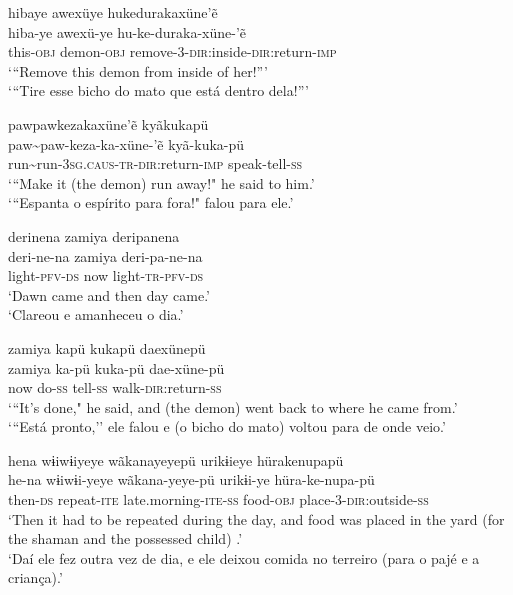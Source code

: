 \documentclass[output=paper,
modfonts,nonflat
]{langsci/langscibook}
\begin{document}
  
\ea     hibaye awexüye hukedurakaxüne'ẽ \\[.3em]
\gll 	hiba-ye awexü-ye hu-ke-duraka-xüne-'ẽ\\
this-\textsc{obj} demon-\textsc{obj} remove-\textsc{3}-\textsc{dir}:inside-\textsc{dir}:return-\textsc{imp}   \\
\glt    `{``}Remove this demon from inside of her!{''}' \\
`{``}Tire esse bicho do mato que está dentro dela!{''}'\\
\z

 
\ea     pawpawkezakaxüne'ẽ kyãkukapü \\[.3em]
\gll 	paw\textasciitilde paw-keza-ka-xüne-'ẽ kyã-kuka-pü\\
run\textasciitilde run-\textsc{3sg.caus}-\textsc{tr}-\textsc{dir}:return-\textsc{imp} speak-tell-\textsc{ss}\\
\glt    `{``}Make it (the demon) run away!" he said to him.' \\
 `{``}Espanta o espírito para fora!" falou para ele.'\\
\z


\ea   derinena zamiya deripanena  \\[.3em]
\gll 	deri-ne-na zamiya deri-pa-ne-na \\
light-\textsc{pfv-ds} now  light-\textsc{tr}-\textsc{pfv-ds} \\
\glt  `Dawn came and then day came.' \\
`Clareou e amanheceu o dia.'\\
\z

\ea   zamiya kapü kukapü daexünepü \\[.3em]
\gll 	zamiya ka-pü kuka-pü dae-xüne-pü\\
now do-\textsc{ss} tell-\textsc{ss} walk-\textsc{dir}:return-\textsc{ss}\\
\glt  `{``}It's done," he said, and (the demon) went back to where he came from.' \\
`{``}Está pronto,'' ele falou e (o bicho do mato) voltou para de onde veio.'   \\
\z

\ea   hena wɨiwɨiyeye wãkanayeyepü urikɨieye hürakenupapü \\[.3em]
\gll 	he-na wɨiwɨi-yeye wãkana-yeye-pü urikɨi-ye hüra-ke-nupa-pü\\
then-\textsc{ds} repeat-\textsc{ite} late.morning-\textsc{ite-ss} food-\textsc{obj} place-\textsc{3}-\textsc{dir}:outside-\textsc{ss}\\
\glt `Then it had to be repeated during the day, and food was placed in the yard (for the shaman and the possessed child) .' \\
`Daí ele fez outra vez de dia, e ele deixou comida no terreiro (para o pajé e a criança).'
\z
\end{document}
